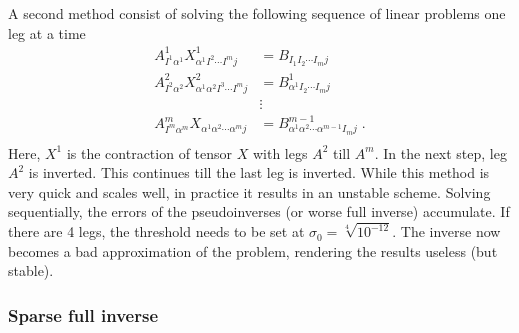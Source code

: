A second method consist of solving the following sequence of linear problems one leg at a time
\begin{equation}
  \begin{split}
    A^1_{ I^1 \alpha^1 } X^1_{ \alpha^1  I^2 \cdots I^m j} &=  B_{  I_1  I_2 \cdots I_m   j }\\
    A^2_{ I^2 \alpha^2 } X^2_{ \alpha^1   \alpha^2  I^3 \cdots I^m j} &=  B^1_{  \alpha^1  I_2 \cdots I_m   j }\\
    &\vdots\\
    A^m_{ I^m \alpha^m } X_{ \alpha^1 \alpha^2 \cdots \alpha^m j  } &=  B^{m-1}_{ \alpha^1 \alpha^2 \cdots \alpha^{m-1} I_m   j } \;.\\
  \end{split}
\end{equation}
Here, $X^1$ is the contraction of tensor $X$ with legs $A^2$ till $A^m$. In the next step, leg $A^2$ is inverted. This continues till the last leg is inverted.
While this method is very quick and scales well, in practice it results in an unstable scheme. Solving sequentially, the errors of the pseudoinverses (or worse full inverse) accumulate. If there are 4 legs, the threshold needs to be set at $ \sigma_0 = \sqrt[4]{ 10^{-12} } $. The inverse now becomes a bad approximation of the problem, rendering the results useless (but stable).

\subsubsection{Sparse full inverse}

